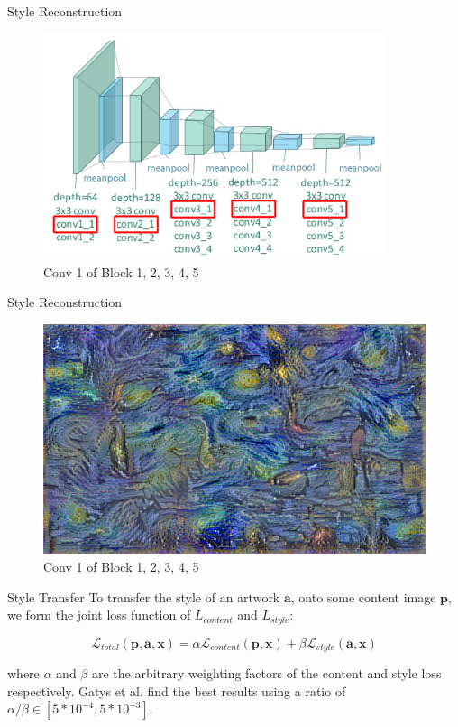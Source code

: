 \documentclass{beamer}
\begin{document}
\begin{frame}{Style Reconstruction}
\begin{figure}[ht]
\centering
\caption{Conv 1 of Block 1, 2, 3, 4, 5}
\includegraphics[width=0.9\textwidth]{img/vgg19/style/block5_conv1}
\end{figure}
\end{frame}
\begin{frame}{Style Reconstruction}
\begin{figure}[ht]
\centering
\caption{Conv 1 of Block 1, 2, 3, 4, 5}
\includegraphics[width=\textwidth]{img/style/block5_conv1.png}
\end{figure}
\end{frame}



\begin{frame}{Style Transfer}
To transfer the style of an artwork $\textbf{a}$, onto some content image
$\textbf{p}$, we form the joint loss function of $L_{content}$ and
$L_{style}$:

\begin{equation}
    \mathcal{L}_{total}(\mathbf{p}, \mathbf{a}, \mathbf{x}) =
    \alpha \mathcal{L}_{content}(\mathbf{p}, \mathbf{x}) +
    \beta \mathcal{L}_{style}(\mathbf{a}, \mathbf{x})
\end{equation}

where $\alpha$ and $\beta$ are the arbitrary weighting factors of the content
and style loss respectively. Gatys et al. find the best results using a ratio
of $\alpha / \beta \in [5*10^{-4}, 5*10^{-3}]$.
\end{frame}
\end{document}
